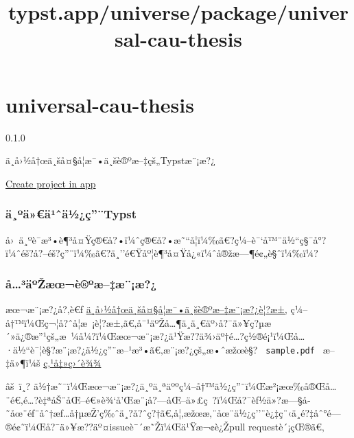 \title{typst.app/universe/package/universal-cau-thesis}

\label{banner}
\label{template-thumbnail}

\section{universal-cau-thesis}\label{universal-cau-thesis}

{ 0.1.0 }

ä¸­å›½å†œä¸šå¤§å­¦æ¯•ä¸šè®ºæ--‡çš„Typstæ¨¡æ?¿

\href{/app?template=universal-cau-thesis&version=0.1.0}{Create project
in app}

\label{readme}
\subsubsection{ä¸ºä»€ä¹ˆä½¿ç''¨Typst}\label{uxe4uxbauxe4uxe4uxb9ux2c6uxe4uxbduxe7typst}

å›~ä¸ºè¯­æ³•è¶³å¤Ÿç®€å?•ï¼ˆç®€å?•æ˜``å­¦ï¼‰ã€?ç¼--è¯`å™¨ä½``ç§¯å°?ï¼ˆéš?å?--éš?ç''¨ï¼‰ã€?ä¸''é€Ÿåº¦è¶³å¤Ÿå¿«ï¼ˆå®žæ---¶é¢„è§ˆï¼‰ï¼?


\subsubsection{å\ldots³äºŽæœ¬è®ºæ--‡æ¨¡æ?¿}\label{uxe5uxb3uxe4uxbaux17euxe6ux153uxe8uxbauxe6uxe6uxe6}

æœ¬æ¨¡æ?¿å?‚è€ƒ
\href{https://jwc.cau.edu.cn/art/2020/2/25/art_14181_663910.html}{ä¸­å›½å†œä¸šå¤§å­¦æ¯•ä¸šè®ºæ--‡æ¨¡æ?¿è¦?æ±‚}
ç¼--å†™ï¼Œç¬¦å?ˆå­¦æ~¡è¦?æ±‚ã€‚å¯¹äºŽå\ldots¶ä¸­ä¸€äº›å?¯ä»¥ç?µæ´»ä¿®æ''¹çš„æ~¼å¼?ï¼Œæœ¬æ¨¡æ?¿ä¹Ÿæ??ä¾›äº†é\ldots?ç½®é¡¹ï¼Œå\ldots·ä½``è¯¦è§?æ¨¡æ?¿ä½¿ç''¨æ--¹æ³•ã€‚æ¨¡æ?¿çš„æ•ˆæžœè§?
\texttt{\ sample.pdf\ } æ--‡ä»¶ï¼š
\href{https://github.com/JWangL5/CAU-ThesisTemplate-Typst/blob/master/sample.pdf}{ç‚¹å‡»ç›´è¾¾}

âš~ï¸?
ä½†æ˜¯ï¼Œæœ¬æ¨¡æ?¿ä¸ºä¸ªäººç¼--å†™ä½¿ç''¨ï¼Œæ²¡æœ‰å®Œå\ldots¨é€‚é\ldots?è‡ªåŠ¨åŒ--é€»è¾`å'Œæ¨¡å?---åŒ--ä»£ç~?ï¼Œå?¯èƒ½ä»?æ---§å­˜åœ¨éƒ¨åˆ†æƒ\ldots å†µæŽ'ç‰ˆä¸?å?ˆç?†ã€‚å¦‚æžœæ‚¨åœ¨ä½¿ç''¨è¿‡ç¨‹ä¸­é?‡åˆ°é---®é¢˜ï¼Œå?¯ä»¥æ??äº¤issueè¯´æ˜Žï¼Œä¹Ÿæ¬¢è¿Žpull
requestè´¡çŒ®ã€‚

